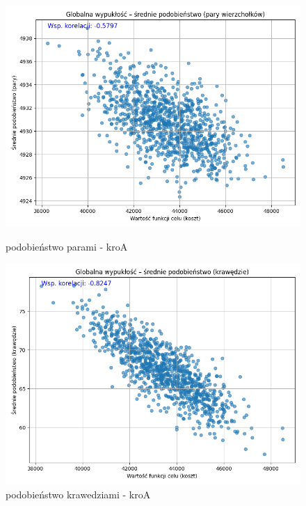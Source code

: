 \documentclass[11pt]{article}
\begin{document}
\begin{figure}[H]
    \begin{minipage}[t]{0.45\textwidth}
        \centering
        \includegraphics[width=\linewidth]{wypuklosci/podobienstwo-parami-kroA}
        \caption{podobieństwo parami - kroA}
    \end{minipage}
    \hfill
    \begin{minipage}[t]{0.45\textwidth}
        \centering
        \includegraphics[width=\linewidth]{wypuklosci/podobienstwo-krawedziami-kroA}
        \caption{podobieństwo krawedziami - kroA}
    \end{minipage}\label{fig:figure11}
\end{figure}
\end{document}
